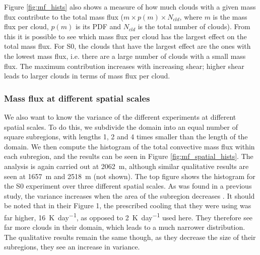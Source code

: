 \documentclass[11pt,a4paper]{article}
\newcommand\todo[1]{\textbf{TODO: #1}}
\begin{document}
Figure \ref{fig:mf_hists} also shows a measure of how much clouds with a given mass flux contribute to the total mass flux ($m \times p(m) \times N_{cld}$, where $m$ is the mass flux per cloud, $p(m)$ is its PDF and $N_{cld}$ is the total number of clouds). From this it is possible to see which mass flux per cloud has the largest effect on the total mass flux. For S0, the clouds that have the largest effect are the ones with the lowest mass flux, i.e. there are a large number of clouds with a small mass flux. The maximum contribution increases with increasing shear; higher shear leads to larger clouds in terms of mass flux per cloud.

%
\subsubsection{Mass flux at different spatial scales}
We also want to know the variance of the different experiments at different spatial scales. To do this, we subdivide the domain into an equal number of square subregions, with lengths 1, 2 and 4 times smaller than the length of the domain. We then compute the histogram of the total convective mass flux within each subregion, and the results can be seen in Figure \ref{fig:mf_spatial_hists}. The analysis is again carried out at \SI{2062}{m}, although similar qualitative results are seen at \SI{1657}{m} and \SI{2518}{m} (not shown). The top figure shows the histogram for the S0 experiment over three different spatial scales. As was found in a previous study, the variance increases when the area of the subregion decreases \parencite{PC2008}. It should be noted that in their Figure 1, the prescribed cooling that they were using was far higher, \SI{16}{K.day^{-1}}, as opposed to \SI{2}{K.day^{-1}} used here. They therefore see far more clouds in their domain, which leads to a much narrower distribution. The qualitative results remain the same though, as they decrease the size of their subregions, they see an increase in variance.
\end{document}
